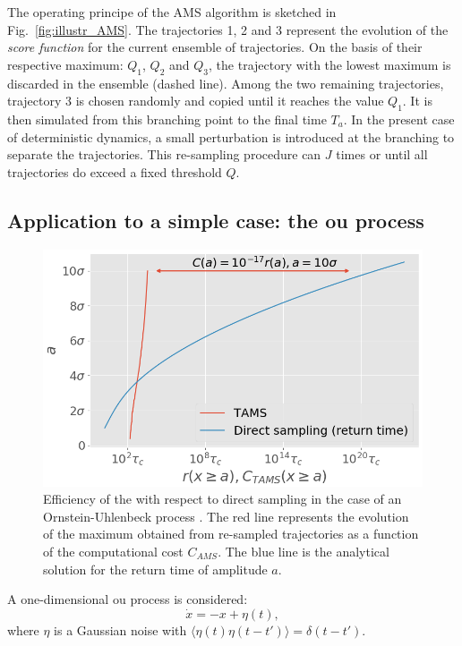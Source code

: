 \documentclass{jfm}
\newcommand{\EL}[1]{{\color{myred}{#1}}}
\newcommand{\QQ}[1]{{\color{green}{#1}}}
\begin{document}
The operating principe of the AMS algorithm is sketched in Fig.~\ref{fig:illustr_AMS}.
%
The trajectories 1, 2 and 3 represent the evolution of the \emph{score function} for the current ensemble of trajectories. On the basis of their respective maximum: $Q_1$, $Q_2$ and $Q_3$, the trajectory with the lowest maximum is discarded in the ensemble (dashed line). Among the two remaining trajectories, trajectory 3 is chosen randomly and copied until it reaches the value $Q_1$. It is then simulated from this branching point to the final time $T_a$. In the present case of deterministic dynamics, a small perturbation is introduced at the branching to separate the trajectories. This re-sampling procedure can \EL{be iterated} $J$ times or until all trajectories do exceed a fixed threshold $Q$.

\subsection{Application to a simple case: the \acl{ou} process}
	
	\begin{figure}
		\centering
		\includegraphics[width=.7\linewidth]{AMS_OU/AMS_OU.png}
		\caption{\QQ{Change TAMS TO AMS} Efficiency of the \EL{\ac{ams} algorithm} with respect to direct sampling in the case of an Ornstein-Uhlenbeck process \citep{lestang_computing_2018}. The red line represents the evolution of the maximum obtained from re-sampled trajectories as a function of the computational cost $C_{AMS}$. The blue line is the analytical solution for the return time of amplitude $a$.}
		\label{fig:comparaison_temps_de_retour}
	\end{figure}
	A one-dimensional \acl{ou} process is considered:
	\begin{equation}
	\label{eq:ou}
	\dot{x} = -x + \eta (t),
	\end{equation}
	where $\eta$ is a Gaussian noise with $\langle \eta(t)\eta(t-t')\rangle = \delta(t-t')$.
	
\end{document}
